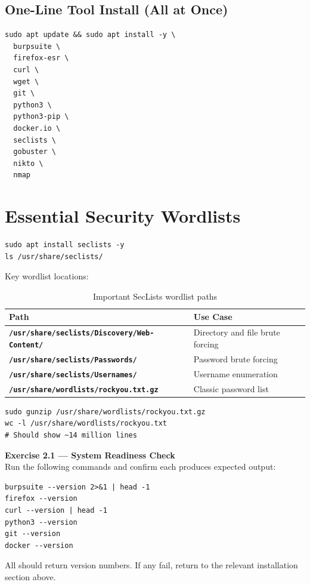 
\subsection{One-Line Tool Install (All at Once)}

\begin{lstlisting}[style=terminal, caption={Install all required tools in one command}]
sudo apt update && sudo apt install -y \
  burpsuite \
  firefox-esr \
  curl \
  wget \
  git \
  python3 \
  python3-pip \
  docker.io \
  seclists \
  gobuster \
  nikto \
  nmap
\end{lstlisting}

\section{Essential Security Wordlists}

\begin{lstlisting}[style=terminal, caption={Install SecLists}]
sudo apt install seclists -y
ls /usr/share/seclists/
\end{lstlisting}

Key wordlist locations:

\begin{table}[H]
\centering
\caption{Important SecLists wordlist paths}
\begin{tabularx}{\textwidth}{>{\bfseries}lX}
\toprule
Path & Use Case \\
\midrule
\texttt{/usr/share/seclists/Discovery/Web-Content/} & Directory and file brute forcing \\
\texttt{/usr/share/seclists/Passwords/} & Password brute forcing \\
\texttt{/usr/share/seclists/Usernames/} & Username enumeration \\
\texttt{/usr/share/wordlists/rockyou.txt.gz} & Classic password list \\
\bottomrule
\end{tabularx}
\end{table}

\begin{lstlisting}[style=terminal, caption={Decompress rockyou.txt}]
sudo gunzip /usr/share/wordlists/rockyou.txt.gz
wc -l /usr/share/wordlists/rockyou.txt
# Should show ~14 million lines
\end{lstlisting}

\begin{tcolorbox}[exercisestyle]
\textbf{Exercise 2.1 — System Readiness Check}\\[4pt]
Run the following commands and confirm each produces expected output:
\begin{lstlisting}[style=terminal]
burpsuite --version 2>&1 | head -1
firefox --version
curl --version | head -1
python3 --version
git --version
docker --version
\end{lstlisting}
All should return version numbers. If any fail, return to the relevant installation section above.
\end{tcolorbox}
